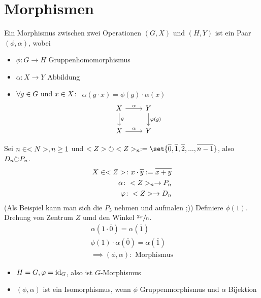 \section{Morphismen}
\begin{definition}
	Ein Morphismus zwischen zwei Operationen $(G,X)$ und $(H,Y)$ ist ein Paar $(\phi, \alpha)$, wobei
	\begin{itemize}
		\item $\phi\colon G \to H$ Gruppenhomomorphismus
		\item $\alpha\colon X \to Y$ Abbildung
		\item $\forall g \in G \text{ und } x \in X\colon$ $\alpha(g \cdot x) = \phi(g)\cdot \alpha(x)$
		\[
			\begin{tikzcd}
			X \arrow[r, "\alpha"] \arrow[d, "g"] & Y \arrow[d, "\phi(g)"] \\
			X \arrow[r, "\alpha"]                & Y                     
			\end{tikzcd}
		\] 
	\end{itemize}
\end{definition}
\begin{*example}
	Sei $n \in <N>, n \ge 1$ und $\Z \Circlearrowleft \Z_n := \set{\overline{0}, \overline{1}, \overline{2}, ..., \overline{n-1}}$, also $D_n \Circlearrowleft P_n$.
	\begin{align*}
		X \in \Z \colon x \cdot \overline{y} := \overline{x+y}\\
		\alpha\colon \Z_n \to P_n\\
		\phi\colon \Z \to D_n
	\end{align*}
	(Als Beispiel kann man sich die $P_5$ nehmen und aufmalen ;))
	Definiere $\phi(1)$. Drehung von Zentrum $Z$ umd den Winkel $\sfrac{2\pi}{n}$.
	\begin{align*}
		\alpha(1 \cdot \overline{0}) = \alpha(\overline{1})\\
		\phi(1)\cdot \alpha(\overline{0}) = \alpha(\overline{1})\\
		\implies (\phi,\alpha)\colon \text{ Morphismus}
	\end{align*}
\end{*example}
\begin{definition}
	\begin{itemize}
		\item $H = G, \varphi = \operatorname{id}_G$, also ist $G$-Morphismus
		\item $(\phi, \alpha)$ ist ein Isomorphismus, wenn $\phi$ Gruppenmorphismus und $\alpha$ Bijektion
	\end{itemize}
\end{definition}
